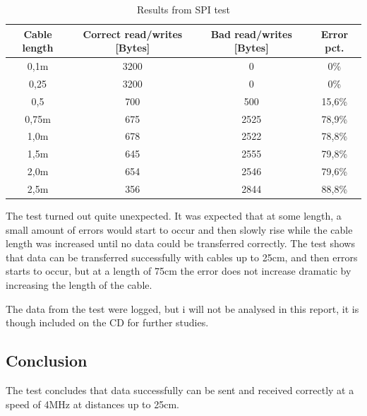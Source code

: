 \begin{table}[htb]								%
	\begin{center}
	\begin{tabular}{c|c|c|c}					%
	Cable length & Correct read/writes [Bytes] & Bad read/writes [Bytes] & Error pct. \\			%
	\hline													%
	0,1m & 3200 & 0 & 0\%  \\
	0,25 & 3200 & 0 & 0\% \\
	0,5 & 700 & 500 & 15,6\% \\
	0,75m & 675 & 2525 & 78,9\% \\
	1,0m & 678 & 2522 & 78,8\% \\
	1,5m & 645 & 2555 & 79,8\% \\
	2,0m & 654 & 2546 & 79,6\% \\
	2,5m & 356 & 2844 & 88,8\%
	\end{tabular}
	\end{center}
	\caption{Results from SPI test}				%
	\label{tab:spi_test_results}			%
\end{table}


The test turned out quite unexpected. It was expected that at some length, a small amount of errors would start to occur and then slowly rise while the cable length was increased until no data could be transferred correctly. The test shows that data can be transferred successfully with cables up to 25cm, and then errors starts to occur, but at a length of 75cm the error does not increase dramatic by increasing the length of the cable.

The data from the test were logged, but i will not be analysed in this report, it is though included on the CD for further studies.

\subsection{Conclusion}
The test concludes that data successfully can be sent and received correctly at a speed of 4MHz at distances up to 25cm.
